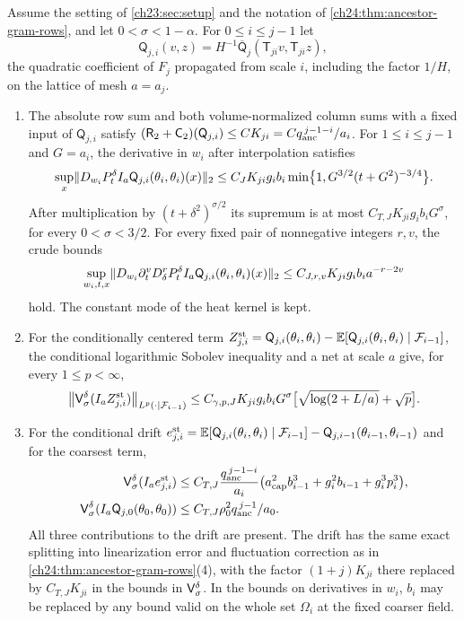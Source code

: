 \begin{theorem}\label{ch24:thm:full-smoother-return}
Assume the setting of \cref{ch23:sec:setup} and the notation of \cref{ch24:thm:ancestor-gram-rows}, and let $0<\sigma<1-\alpha$. For $0\le i\le j-1$ let
\[
 \mathsf Q_{j,i}(v,z)=H^{-1}\overline{\mathsf Q}_j(\mathsf T_{ji}v,\mathsf T_{ji}z),
\]
the quadratic coefficient of $F_j$ propagated from scale $i$, including the factor $1/H$, on the lattice of mesh $a=a_j$.
\begin{enumerate}
\item The absolute row sum and both volume-normalized column sums with a fixed input of $\mathsf Q_{j,i}$ satisfy $(\mathsf R_2+\mathsf C_2)(\mathsf Q_{j,i})\le CK_{ji}=Cq_{\mathrm{anc}}^{\,j-1-i}/a_i$. For $1\le i\le j-1$ and $G=a_i$, the derivative in $w_i$ after interpolation satisfies
\[
 \sup_x\lVert D_{w_i}P_t^\delta I_a\mathsf Q_{j,i}(\theta_i,\theta_i)(x)\rVert_2\le C_JK_{ji}g_ib_i\min\bigl\{1,G^{3/2}(t+G^2)^{-3/4}\bigr\}.
\]
After multiplication by $(t+\delta^2)^{\sigma/2}$ its supremum is at most $C_{T,J}K_{ji}g_ib_iG^\sigma$, for every $0<\sigma<3/2$. For every fixed pair of nonnegative integers $r,v$, the crude bounds
\[
 \sup_{w_i,t,x}\lVert D_{w_i}\partial_t^vD_\delta^rP_t^\delta I_a\mathsf Q_{j,i}(\theta_i,\theta_i)(x)\rVert_2\le C_{J,r,v}K_{ji}g_ib_ia^{-r-2v}
\]
hold. The constant mode of the heat kernel is kept.
\item For the conditionally centered term $Z_{j,i}^{\mathrm{st}}=\mathsf Q_{j,i}(\theta_i,\theta_i)-\mathbb E[\mathsf Q_{j,i}(\theta_i,\theta_i)\mid\mathcal F_{i-1}]$, the conditional logarithmic Sobolev inequality and a net at scale $a$ give, for every $1\le p<\infty$,
\[
 \bigl\|\mathsf V_{\sigma}^{\delta}(I_aZ_{j,i}^{\mathrm{st}})\bigr\|_{L^p(\cdot\mid\mathcal F_{i-1})}\le C_{\gamma,p,J}K_{ji}g_ib_iG^\sigma\bigl[\sqrt{\log(2+L/a)}+\sqrt p\bigr].
\]
\item For the conditional drift $e_{j,i}^{\mathrm{st}}=\mathbb E[\mathsf Q_{j,i}(\theta_i,\theta_i)\mid\mathcal F_{i-1}]-\mathsf Q_{j,i-1}(\theta_{i-1},\theta_{i-1})$ and for the coarsest term,
\begin{align*}
 \mathsf V_{\sigma}^{\delta}(I_ae_{j,i}^{\mathrm{st}})&\le C_{T,J}\frac{q_{\mathrm{anc}}^{\,j-1-i}}{a_i}\bigl(a_{\mathrm{cap}}^2b_{i-1}^3+g_i^2b_{i-1}+g_i^3p_i^3\bigr),\\
 \mathsf V_{\sigma}^{\delta}(I_a\mathsf Q_{j,0}(\theta_0,\theta_0))&\le C_{T,J}\rho_0^2q_{\mathrm{anc}}^{\,j-1}/a_0.
\end{align*}
All three contributions to the drift are present. The drift has the same exact splitting into linearization error and fluctuation correction as in \cref{ch24:thm:ancestor-gram-rows}(4), with the factor $(1+j)K_{ji}$ there replaced by $C_{T,J}K_{ji}$ in the bounds in $\mathsf V_{\sigma}^{\delta}$. In the bounds on derivatives in $w_i$, $b_i$ may be replaced by any bound valid on the whole set $\Omega_i$ at the fixed coarser field.

\end{enumerate}
\end{theorem}
